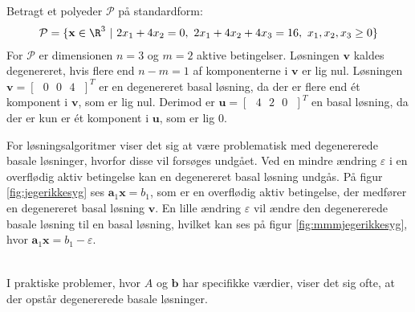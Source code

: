 \begin{eks}{}{}
%
%
Betragt et polyeder $\mathcal{P}$ på standardform: 
%
\begin{align*}
\mathcal{P} = \{ 
\mathbf{x} \in \R^3 \text{  } | 
\text{  } 2 x_1 + 4 x_2 = 0, 
\text{  } 2 x_1 + 4 x_2 + 4 x_3 = 16, 
\text{  } x_1 , x_2, x_3 \geq 0 \}
\end{align*}
%
For $\mathcal{P}$ er dimensionen $n = 3$ og $m = 2$ aktive betingelser. 
Løsningen $\mathbf{v}$ kaldes degenereret, hvis flere end $n-m=1$ af komponenterne i $\mathbf{v}$ er lig nul.
Løsningen $\mathbf{v}= [ \text{ } 0 \text{  } 0 \text{  } 4 \text{ } ]^T $ er en degenereret basal løsning, da der er flere end ét komponent i $\mathbf{v}$, som er lig nul. 
Derimod er  $\mathbf{u}= [ \text{ } 4 \text{  } 2 \text{  } 0 \text{ } ]^T $ en basal løsning, da der er kun er ét komponent i $\mathbf{u}$, som er lig $0$. 
%
\end{eks}
% 
%
%
For løsningsalgoritmer viser det sig at være problematisk med degenererede basale løsninger, hvorfor disse vil forsøges undgået. 
Ved en mindre ændring $\varepsilon$ i en overflødig aktiv betingelse kan en degenereret basal løsning undgås. 
På figur \ref{fig:jegerikkesyg} ses $\mathbf{a}_1 \mathbf{x} = b_1$, som er en overflødig aktiv betingelse, der medfører en degenereret basal løsning $\mathbf{v}$.
En lille ændring $\varepsilon$ vil ændre den degenererede basale løsning til en basal løsning, hvilket kan ses på figur \ref{fig:mmmjegerikkesyg}, hvor 
$\mathbf{a}_1 \mathbf{x} = b_1 - \varepsilon$.
%
%
\begin{center}
$
\begin{array}{cc}
&

\end{array}
$
\end{center}
%
%
I praktiske problemer, hvor $A$ og $\mathbf{b}$ har specifikke værdier, viser det sig ofte, at der opstår degenererede basale løsninger.
%